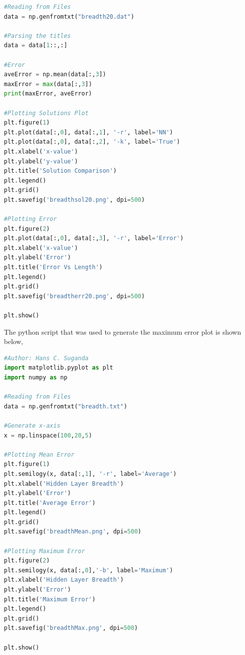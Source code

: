 \documentclass[a4paper, 12pt]{report}
\begin{document}
\begin{center}
\begin{lstlisting}[language=python]
#Reading from Files
data = np.genfromtxt("breadth20.dat")

#Parsing the titles
data = data[1::,:]

#Error
aveError = np.mean(data[:,3])
maxError = max(data[:,3])
print(maxError, aveError)

#Plotting Solutions Plot
plt.figure(1)
plt.plot(data[:,0], data[:,1], '-r', label='NN')
plt.plot(data[:,0], data[:,2], '-k', label='True')
plt.xlabel('x-value')
plt.ylabel('y-value')
plt.title('Solution Comparison')
plt.legend()
plt.grid()
plt.savefig('breadthsol20.png', dpi=500)

#Plotting Error
plt.figure(2)
plt.plot(data[:,0], data[:,3], '-r', label='Error')
plt.xlabel('x-value')
plt.ylabel('Error')
plt.title('Error Vs Length')
plt.legend()
plt.grid()
plt.savefig('breadtherr20.png', dpi=500)

plt.show()
\end{lstlisting}
$$$$
The python script that was used to generate the maximum error plot is shown below,
\begin{lstlisting}[language=python]
#Author: Hans C. Suganda
import matplotlib.pyplot as plt
import numpy as np

#Reading from Files
data = np.genfromtxt("breadth.txt")

#Generate x-axis
x = np.linspace(100,20,5)

#Plotting Mean Error
plt.figure(1)
plt.semilogy(x, data[:,1], '-r', label='Average')
plt.xlabel('Hidden Layer Breadth')
plt.ylabel('Error')
plt.title('Average Error')
plt.legend()
plt.grid()
plt.savefig('breadthMean.png', dpi=500)

#Plotting Maximum Error
plt.figure(2)
plt.semilogy(x, data[:,0],'-b', label='Maximum')
plt.xlabel('Hidden Layer Breadth')
plt.ylabel('Error')
plt.title('Maximum Error')
plt.legend()
plt.grid()
plt.savefig('breadthMax.png', dpi=500)

plt.show()
\end{lstlisting}
\end{center}
\end{document}
